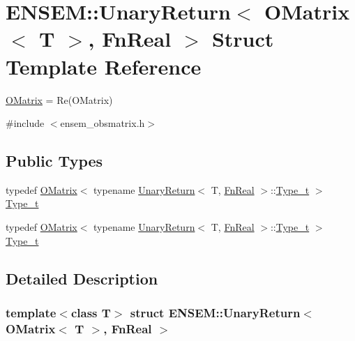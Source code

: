 \hypertarget{structENSEM_1_1UnaryReturn_3_01OMatrix_3_01T_01_4_00_01FnReal_01_4}{}\section{E\+N\+S\+EM\+:\+:Unary\+Return$<$ O\+Matrix$<$ T $>$, Fn\+Real $>$ Struct Template Reference}
\label{structENSEM_1_1UnaryReturn_3_01OMatrix_3_01T_01_4_00_01FnReal_01_4}


\mbox{\hyperlink{classENSEM_1_1OMatrix}{O\+Matrix}} = Re(\+O\+Matrix)  




{\ttfamily \#include $<$ensem\+\_\+obsmatrix.\+h$>$}

\subsection*{Public Types}
\begin{DoxyCompactItemize}
\item 
typedef \mbox{\hyperlink{classENSEM_1_1OMatrix}{O\+Matrix}}$<$ typename \mbox{\hyperlink{structENSEM_1_1UnaryReturn}{Unary\+Return}}$<$ T, \mbox{\hyperlink{structENSEM_1_1FnReal}{Fn\+Real}} $>$\+::\mbox{\hyperlink{structENSEM_1_1UnaryReturn_3_01OMatrix_3_01T_01_4_00_01FnReal_01_4_a060b381191f238b0c1dc9189a3a14c6d}{Type\+\_\+t}} $>$ \mbox{\hyperlink{structENSEM_1_1UnaryReturn_3_01OMatrix_3_01T_01_4_00_01FnReal_01_4_a060b381191f238b0c1dc9189a3a14c6d}{Type\+\_\+t}}
\item 
typedef \mbox{\hyperlink{classENSEM_1_1OMatrix}{O\+Matrix}}$<$ typename \mbox{\hyperlink{structENSEM_1_1UnaryReturn}{Unary\+Return}}$<$ T, \mbox{\hyperlink{structENSEM_1_1FnReal}{Fn\+Real}} $>$\+::\mbox{\hyperlink{structENSEM_1_1UnaryReturn_3_01OMatrix_3_01T_01_4_00_01FnReal_01_4_a060b381191f238b0c1dc9189a3a14c6d}{Type\+\_\+t}} $>$ \mbox{\hyperlink{structENSEM_1_1UnaryReturn_3_01OMatrix_3_01T_01_4_00_01FnReal_01_4_a060b381191f238b0c1dc9189a3a14c6d}{Type\+\_\+t}}
\end{DoxyCompactItemize}


\subsection{Detailed Description}
\subsubsection*{template$<$class T$>$\newline
struct E\+N\+S\+E\+M\+::\+Unary\+Return$<$ O\+Matrix$<$ T $>$, Fn\+Real $>$}

